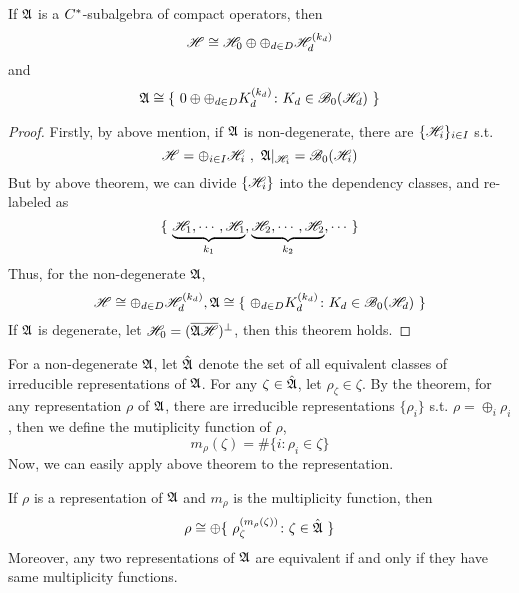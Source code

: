 \documentclass[a4paper,11pt]{report}
\begin{document}
\begin{thm}
	If $\mathfrak{A}$ is a $C^{*}$-subalgebra of compact operators, then
	\begin{equation*}
		\mathscr{H} \cong \mathscr{H}_0 \oplus \oplus_{d \in D} \mathscr{H}_d^{(k_d)}
	\end{equation*}
	and
	\begin{equation*}
		\mathfrak{A} \cong \{~0 \oplus \oplus_{d \in D} K_d^{(k_d)} \colon K_d \in \mathscr{B}_0(\mathscr{H}_d)~\}
	\end{equation*}
\end{thm}
\begin{proof}
	Firstly, by above mention, if $\mathfrak{A}$ is non-degenerate, there are $\{\mathscr{H}_i\}_{i \in I}$ s.t. 
	\begin{equation*}
		\mathscr{H} = \oplus_{i \in I} \mathscr{H}_i~,~ \mathfrak{A}|_{\mathscr{H}_i} = \mathscr{B}_0(\mathscr{H}_i)
	\end{equation*}
	But by above theorem, we can divide $\{\mathscr{H}_i\}$ into the dependency classes, and re-labeled as 
	\begin{equation*}
		\{~\underbrace{\mathscr{H}_1,\cdots,\mathscr{H}_1}_{k_1},\underbrace{\mathscr{H}_2,\cdots,\mathscr{H}_2}_{k_2}, \cdots~\}
	\end{equation*}
	Thus, for the non-degenerate $\mathfrak{A}$,
	\begin{equation*}
		\mathscr{H} \cong \oplus_{d \in D} \mathscr{H}_d^{(k_d)}, \mathfrak{A} \cong \{~\oplus_{d \in D} K_d^{(k_d)} \colon K_d \in \mathscr{B}_0(\mathscr{H}_d)~\}
	\end{equation*}
	If $\mathfrak{A}$ is degenerate, let $\mathscr{H}_0 = (\overline{\mathfrak{A} \mathscr{H}})^{\bot}$, then this theorem holds.
\end{proof}

For a non-degenerate $\mathfrak{A}$, let $\hat{\mathfrak{A}}$ denote the set of all equivalent classes of irreducible representations of $\mathfrak{A}$. For any $\zeta \in \hat{\mathfrak{A}}$, let $\rho_{\zeta} \in \zeta$. By the theorem, for any representation $\rho$ of $\mathfrak{A}$, there are irreducible representations $\{\rho_i\}$ s.t. $\rho = \oplus_i \rho_i$, then we define the mutiplicity function of $\rho$,
\begin{equation*}
	m_{\rho}(\zeta) = \#\{i \colon \rho_i \in \zeta\}
\end{equation*}
Now, we can easily apply above theorem to the representation. 

\begin{thm}
	If $\rho$ is a representation of $\mathfrak{A}$ and $m_{\rho}$ is the multiplicity function, then
	\begin{equation*}
		\rho \cong \oplus \{~\rho_{\zeta}^{(m_{\rho}(\zeta))} \colon \zeta \in \hat{\mathfrak{A}}~\}
	\end{equation*}
	Moreover, any two representations of $\mathfrak{A}$ are equivalent if and only if they have same multiplicity functions.
\end{thm}
\end{document}
